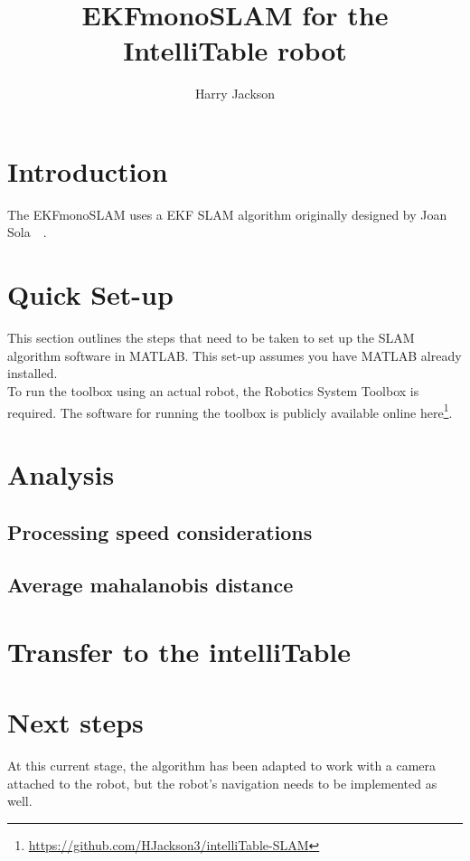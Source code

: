 \documentclass[11pt]{amsart}
\title{EKFmonoSLAM for the IntelliTable robot}
\author{Harry Jackson}
\begin{document}
\maketitle
\section{Introduction}
The EKFmonoSLAM uses a EKF SLAM algorithm originally designed by Joan Sola~\cite{sola2012impact}~\cite{sola2008fusing}.
\section{Quick Set-up}
This section outlines the steps that need to be taken to set up the SLAM algorithm software in MATLAB. This set-up assumes you have MATLAB already installed.
\\
To run the toolbox using an actual robot, the Robotics System Toolbox is required. The software for running the toolbox is publicly available online here\footnote{\url{https://github.com/HJackson3/intelliTable-SLAM}}.

\section{Analysis}

\subsection{Processing speed considerations}

\subsection{Average mahalanobis distance}

\section{Transfer to the intelliTable}

\section{Next steps}
At this current stage, the algorithm has been adapted to work with a camera attached to the robot, but the robot's navigation needs to be implemented as well. 

\clearpage
{}

\end{document}
